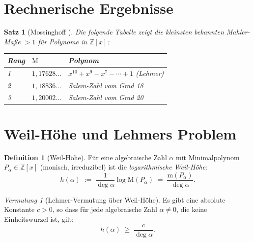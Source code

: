 \documentclass[12pt,a4paper]{amsart}
\newtheorem{satz}[theorem]{Satz}
\theoremstyle{definition}
\newtheorem{definition_de}[theorem]{Definition}
\theoremstyle{remark}
\newtheorem{vermutung}[theorem]{Vermutung}
\newcommand{\Z}{\mathbb{Z}}
\newcommand{\M}{\mathrm{M}}
\newcommand{\m}{\mathrm{m}}
\begin{document}
\section{Rechnerische Ergebnisse}\label{sec:berechnungen}

\begin{satz}[Mossinghoff \cite{Mossinghoff1998}]
  Die folgende Tabelle zeigt die kleinsten bekannten Mahler-Maße $> 1$
  für Polynome in $\Z[x]$:
  \begin{center}
    \begin{tabular}{lll}
      \toprule
      Rang & $\M$ & Polynom \\
      \midrule
      1 & $1{,}17628\ldots$ & $x^{10}+x^9-x^7-\cdots+1$ (Lehmer) \\
      2 & $1{,}18836\ldots$ & Salem-Zahl vom Grad 18 \\
      3 & $1{,}20002\ldots$ & Salem-Zahl vom Grad 20 \\
      \bottomrule
    \end{tabular}
  \end{center}
\end{satz}

\section{Weil-Höhe und Lehmers Problem}\label{sec:weil_hoehe}

\begin{definition_de}[Weil-Höhe]
  Für eine algebraische Zahl $\alpha$ mit Minimalpolynom $P_\alpha \in \Z[x]$ (monisch,
  irreduzibel) ist die \emph{logarithmische Weil-Höhe}:
  \[
    h(\alpha) \;:=\; \frac{1}{\deg\alpha} \log \M(P_\alpha)
              \;=\; \frac{\m(P_\alpha)}{\deg\alpha}.
  \]
\end{definition_de}

\begin{vermutung}[Lehmer-Vermutung über Weil-Höhe]\label{verm:lehmer_hoehe}
  Es gibt eine absolute Konstante $c > 0$, so dass für jede algebraische Zahl
  $\alpha \neq 0$, die keine Einheitswurzel ist, gilt:
  \[
    h(\alpha) \;\geq\; \frac{c}{\deg\alpha}.
  \]
\end{vermutung}
\end{document}
